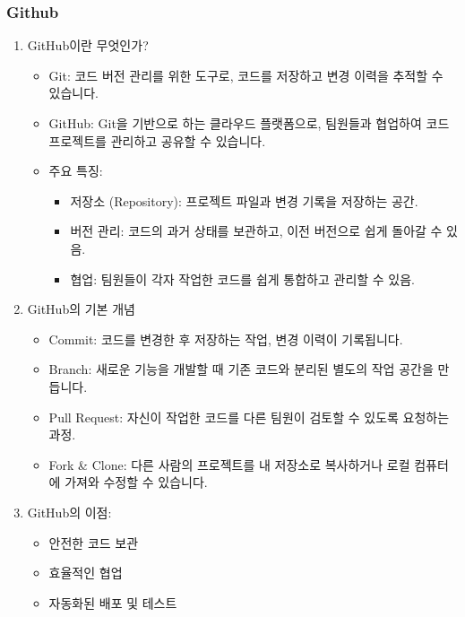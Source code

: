 \documentclass[aspectratio=169,xcolor=dvipsnames,handout]{beamer}
\begin{document}
\begin{frame}[allowframebreaks]
    \frametitle{Github}
    \begin{enumerate}[<+->]
        \item GitHub이란 무엇인가?
        \begin{itemize}[<+->]
            \item Git: 코드 버전 관리를 위한 도구로, 코드를 저장하고 변경 이력을 추적할 수 있습니다.
            \item GitHub: Git을 기반으로 하는 클라우드 플랫폼으로, 팀원들과 협업하여 코드 프로젝트를 관리하고 공유할 수 있습니다.
            \item 주요 특징:
            \begin{itemize}[<+->]
                \item 저장소 (Repository): 프로젝트 파일과 변경 기록을 저장하는 공간.
                \item 버전 관리: 코드의 과거 상태를 보관하고, 이전 버전으로 쉽게 돌아갈 수 있음.
                \item 협업: 팀원들이 각자 작업한 코드를 쉽게 통합하고 관리할 수 있음.
            \end{itemize}
        \end{itemize}
        \framebreak%
        \item GitHub의 기본 개념
        \begin{itemize}[<+->]
            \item Commit: 코드를 변경한 후 저장하는 작업, 변경 이력이 기록됩니다.
            \item Branch: 새로운 기능을 개발할 때 기존 코드와 분리된 별도의 작업 공간을 만듭니다.
            \item Pull Request: 자신이 작업한 코드를 다른 팀원이 검토할 수 있도록 요청하는 과정.
            \item Fork \& Clone: 다른 사람의 프로젝트를 내 저장소로 복사하거나 로컬 컴퓨터에 가져와 수정할 수 있습니다.
        \end{itemize}
        \item GitHub의 이점:
        \begin{itemize}[<+->]
            \item 안전한 코드 보관
            \item 효율적인 협업
            \item 자동화된 배포 및 테스트
        \end{itemize}
    \end{enumerate}
\end{frame}
\end{document}
